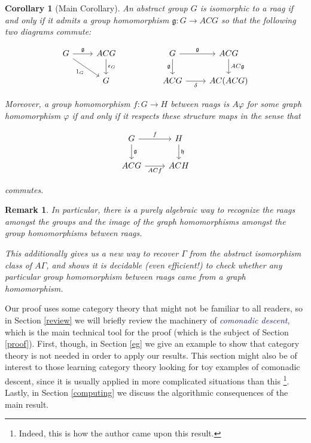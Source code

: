 \documentclass[microtype]{gtpart}
\newtheorem*{rmk}{Remark}
\newtheorem*{cor*}{Corollary}
\theoremstyle{definition}
\theoremstyle{theorem}
\newcommand*{\important}[1]{\textcolor{MidnightBlue}{\emph{#1}}}
\begin{document}
  \begin{cor*}[Main Corollary]
    An abstract group $G$ is isomorphic to a raag if and only if it admits a 
    group homomorphism $\mathfrak{g} : G \to ACG$ so that the following two 
    diagrams commute:

    \setlength\mathsurround{0pt}
    \[
        \begin{tikzcd}
        G & ACG && G   & ACG \\
          & G   && ACG & AC(ACG)
        \arrow["\mathfrak{g}", from=1-1, to=1-2]
        \arrow["{\epsilon_G}", from=1-2, to=2-2]
        \arrow["{1_G}"', from=1-1, to=2-2]
        \arrow["\mathfrak{g}"', from=1-4, to=2-4]
        \arrow["\mathfrak{g}", from=1-4, to=1-5]
        \arrow["\delta"', from=2-4, to=2-5]
        \arrow["AC\mathfrak{g}", from=1-5, to=2-5]
        \end{tikzcd}
    \]
    \setlength\mathsurround{0.8pt}

    Moreover, a group homomorphism $f : G \to H$ between raags is 
    $A \varphi$ for some graph homomorphism $\varphi$ if and only if it 
    respects these structure maps in the sense that 

    \setlength\mathsurround{0pt}
    \[
        \begin{tikzcd}
        G & H \\
        ACG & ACH
        \arrow["\mathfrak{g}", from=1-1, to=2-1]
        \arrow["\mathfrak{h}", from=1-2, to=2-2]
        \arrow["f", from=1-1, to=1-2]
        \arrow["ACf"', from=2-1, to=2-2]
        \end{tikzcd}
    \]    
    \setlength\mathsurround{0.8pt}

    commutes.
  \end{cor*}

  \begin{rmk}
    In particular, there is a purely algebraic way to recognize the 
    raags amongst the groups and the image of the graph homomorphisms 
    amongst the group homomorphisms between raags.

    This additionally gives us a new way to recover $\Gamma$ from the 
    abstract isomorphism class of $A \Gamma$, and shows it is 
    decidable (even efficient!) to check whether any particular
    group homomorphism between raags came from a graph homomorphism.
  \end{rmk}

  Our proof uses some category theory that might not be familiar to all
  readers, so in Section \ref{review} we will briefly review the machinery 
  of \important{comonadic descent}, which is the main technical tool for 
  the proof (which is the subject of Section \ref{proof}). 
  First, though, in Section \ref{eg} we give an example to show that 
  category theory is not needed in order to apply our results.
  This section might also be of interest to 
  those learning category theory looking for toy examples of comonadic descent, 
  since it is usually applied in more complicated situations than this%
  \footnote{Indeed, this is how the author came upon this result.}. 
  Lastly, in Section \ref{computing} we discuss the algorithmic consequences 
  of the main result.
\end{document}
